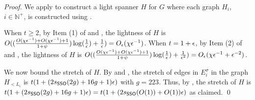 \Framework*
\begin{proof} We apply  to construct a light spanner $H$ for $G$ where each graph $H_i$, $i \in \mathbb{N}^+$, is constructed using .   
	
	When $t\geq 2$, by Item (1) of  and , the lightness of $H$ is $O((\frac{O(\chi \epsilon^{-1}) +  O(\chi \epsilon^{-1}) + 1}{1+\psi})\log(\frac{1}{\epsilon}) + \frac{1}{\epsilon}) = O_{\epsilon}(\chi \epsilon^{-1})$. When $t = 1+\epsilon$, by Item (2) of  and , the lightness of $H$ is $O((\frac{O(\chi \epsilon^{-1}) +  O(\chi \epsilon^{-1}) + 1}{1+\psi})\log(\frac{1}{\epsilon}) + \frac{1}{\epsilon^2}) = O_{\epsilon}(\chi \epsilon^{-1} + \epsilon^{-2})$. 
	
	We now bound the stretch of $H$. By  and , the stretch of edges in $E^{\sigma}_i$ in the graph $H_{<L_i}$  is $t(1 + (2s_{\mathsf{SSO}}(2g) +  16g+1)\epsilon)$ with $g  = 223$. Thus, by , the stretch of $H$ is $t(1 +(2s_{\mathsf{SSO}}(2g) +  16g+1)\epsilon) = t(1 + (2s_{\mathsf{SSO}}(O(1)) +  O(1))\epsilon)$ as claimed.
	\qed
\end{proof}


